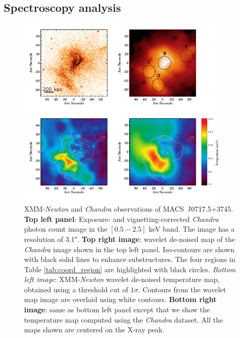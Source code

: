 \documentclass[twocolumn,traditabstract]{aa}
\begin{document}
\subsection{Spectroscopy analysis}\label{sec:Spectroscopy_analysis}
\begin{figure}[h]
\centering
\includegraphics[width=0.9\textwidth]{Figure/MACSJ0717_all_xray_ima.pdf}
\caption{\footnotesize{XMM-\textit{Newton} and \textit{Chandra} observations of \mbox{MACS~J0717.5+3745}. {\bf Top left panel}: Exposure- and vignetting-corrected \textit{Chandra} photon count image in the $[0.5-2.5]$ keV band. The image has a resolution of 3.1". {\bf Top right image}: wavelet de-noised map of the \textit{Chandra} image shown in the top left panel. Iso-contours are shown with black solid lines to enhance substructures. The four regions in Table \ref{tab:coord_region} are highlighted with black circles. \textit{Bottom left image}: XMM-\textit{Newton} wavelet de-noised temperature map, obtained using a threshold cut of $1\sigma$. Contours from the wavelet map image are overlaid using white contours. {\bf Bottom right image}: same as bottom left panel except that we show the temperature map computed using the \textit{Chandra} dataset. All the maps shown are centered on the X-ray peak.}}
\label{fig:Xray_all_maps}
\end{figure}
\end{document}
